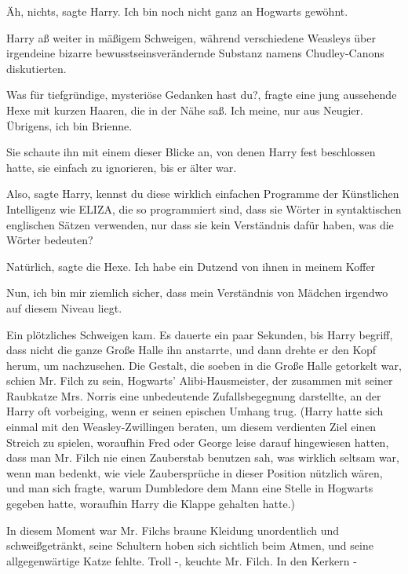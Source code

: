 \glqq{}Äh, nichts\grqq{}, sagte Harry. \glqq{}Ich bin noch nicht ganz an Hogwarts
gewöhnt.\grqq{}

Harry aß weiter in mäßigem Schweigen, während verschiedene Weasleys über
irgendeine bizarre bewusstseinsverändernde Substanz namens Chudley-Canons
diskutierten.

\glqq{}Was für tiefgründige, mysteriöse Gedanken hast du?\grqq{}, fragte eine
jung aussehende Hexe mit kurzen Haaren, die in der Nähe saß. \glqq{}Ich meine,
nur aus Neugier. Übrigens, ich bin Brienne.\grqq{}

Sie schaute ihn mit einem dieser Blicke an, von denen Harry fest beschlossen
hatte, sie einfach zu ignorieren, bis er älter war.

\glqq{}Also\grqq{}, sagte Harry, \glqq{}kennst du diese wirklich einfachen
Programme der Künstlichen Intelligenz wie ELIZA, die so programmiert sind, dass
sie Wörter in syntaktischen englischen Sätzen verwenden, nur dass sie kein
Verständnis dafür haben, was die Wörter bedeuten?\grqq{}

\glqq{}Natürlich\grqq{}, sagte die Hexe. \glqq{}Ich habe ein Dutzend von ihnen in
meinem Koffer\grqq{}

\glqq{}Nun, ich bin mir ziemlich sicher, dass mein Verständnis von Mädchen
irgendwo auf diesem Niveau liegt.\grqq{}

Ein plötzliches Schweigen kam. Es dauerte ein paar Sekunden, bis Harry begriff,
dass nicht die ganze Große Halle ihn anstarrte, und dann drehte er den Kopf
herum, um nachzusehen. Die Gestalt, die soeben in die Große Halle getorkelt war,
schien Mr. Filch zu sein, Hogwarts' Alibi-Hausmeister, der zusammen mit seiner
Raubkatze Mrs. Norris eine unbedeutende Zufallsbegegnung darstellte, an der
Harry oft vorbeiging, wenn er seinen epischen Umhang trug. (Harry hatte sich
einmal mit den Weasley-Zwillingen beraten, um diesem verdienten Ziel einen
Streich zu spielen, woraufhin Fred oder George leise darauf hingewiesen hatten,
dass man Mr. Filch nie einen Zauberstab benutzen sah, was wirklich seltsam war,
wenn man bedenkt, wie viele Zaubersprüche in dieser Position nützlich wären, und
man sich fragte, warum Dumbledore dem Mann eine Stelle in Hogwarts gegeben
hatte, woraufhin Harry die Klappe gehalten hatte.)

In diesem Moment war Mr. Filchs braune Kleidung unordentlich und
schweißgetränkt, seine Schultern hoben sich sichtlich beim Atmen, und seine
allgegenwärtige Katze fehlte. \glqq{}Troll -\grqq{}, keuchte Mr. Filch. \glqq{}In
den Kerkern -\grqq{}

